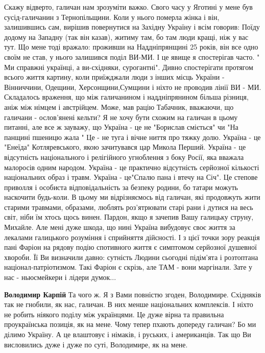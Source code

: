 \begin{itemize}
\begin{itemize}
Скажу відверто, галичан нам зрозуміти важко. Свого часу
у Яготині у мене був сусід-галичанин з Тернопільщини. Коли у нього померла
жінка і він, залишившись сам, вирішив повернутися на Західну Україну і всім
говорив: Поїду додому на Западну (так він казав), житиму там, бо там люди кращі,
ніж у вас тут. Що мене тоді вражало: проживши на Наддніпрянщині 25 років, він
все одно своїм не став, у нього залишився поділ ВИ-МИ. І це явище я спостерігав
часто. " Ми справжні українці, а ви-східняки, сурогантні". Дивно спостерігати
протягом всього життя картину, коли приїжджали люди з інших місць
України - Вінниччини, Одещини, Херсонщини,Сумщини і ніхто не проводив лінії
ВИ - МИ. Складалось враження, що між галичанином і наддніпрянином більша
різниця, аніж між німцем і австрійцем. Може, мав рацію Табачник, вважаючи, що
галичани - ослов'янені кельти? Я не хочу бути схожим на галичан в цьому питанні,
але все ж зауважу, що Україна - це не "Борислав сміється" чи "На панщині пшеницю
жала " Це - не туга і вічне ниття про тяжку долю. Україна - це "Енеїда"
Котляревського, якою зачитувався цар Микола Перший. Україна - це відсутність
національного і релігійного угноблення з боку Росії, яка вважала малоросів
одним народом. Україна - це практично відсутність серйозної кількості
національних образ і травм. Україна - це"Спалю пана і втечу на Січ". Це степове
приволля і особиста відповідальність за безпеку родини, бо татари можуть
наскочити будь-коли. В цьому ми відрізняємось від галичан, які продовжуть жити
старими травмами, образами, люблять роз'ятрювати старі рани і дутися на весь
світ, ніби їм хтось щось винен. Пардон, якщо я зачепив Вашу галицьку струну,
Михайле. Але мені дуже шкода, що нині Україна вибудовує своє життя за лекалами
галицького розуміння і сприйняття дійсності. І з цієї точки зору реакція пані
Фаріон на рядову подію спотивного життя є симптомом серйозної душевної хвороби.
Її Ви визначили давно: сутність Людини сьогодні підім'ята і розтоптана
націонал-патріотизмом. Такі Фаріон є скрізь, але ТАМ  - вони маргінали. Зате у
нас - ньюсмейкери і лідери думок...

 

\textbf{Володимир Карпій} Та чого ж. Я з Вами повністю згоден, Володимире.
Східняків так не гнобили, як нас, галичан. В них менше національних комплексів.
І ніхто не робить ніякого поділу між українцями. Це дуже вірна та правильна
проукраїнська позиція, як на мене. Чому тепер пхають допереду галичан? Бо ми
ділимо Україну. А це влаштовує і німаків, і руських, і американців. Так що Ви
висловились дуже і дуже по суті, Володимире, як на мене.


\end{itemize}
\end{itemize}
